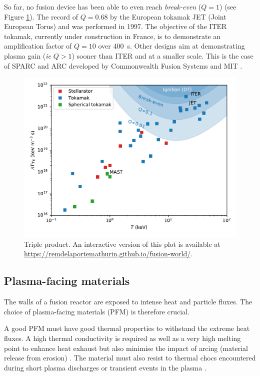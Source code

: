 So far, no fusion device has been able to even reach \textit{break-even} ($Q = 1$) (see Figure \ref{fig: triple product vs T}).
The record of $Q = 0.68$ by the European tokamak JET (Joint European Torus) and was performed in 1997.
The objective of the ITER tokamak, currently under construction in France, is to demonstrate an amplification factor of $Q=10$ over \SI{400}{s}. 
Other designs aim at demonstrating plasma gain (\textit{ie} $Q > 1$) sooner than ITER and at a smaller scale.
This is the case of SPARC and ARC developed by Commonwealth Fusion Systems and MIT .

\begin{figure}
    \centering
    \includegraphics[width=\linewidth]{Figures/Chapter1/triple_product_vs_T.pdf}
    \caption{Triple product. An interactive version of this plot is available at \href{https://remdelaportemathurin.github.io/fusion-world/}{https://remdelaportemathurin.github.io/fusion-world/}.}
    \label{fig: triple product vs T}
\end{figure}

\subsection{Plasma-facing materials}

The walls of a fusion reactor are exposed to intense heat and particle fluxes.
The choice of plasma-facing materials (PFM) is therefore crucial.

A good PFM must have good thermal properties to withstand the extreme heat fluxes.
A high thermal conductivity is required as well as a very high melting point to enhance heat exhaust but also minimise the impact of arcing (material release from erosion) .
The material must also resist to thermal chocs encountered during short plasma discharges or transient events in the plasma .

